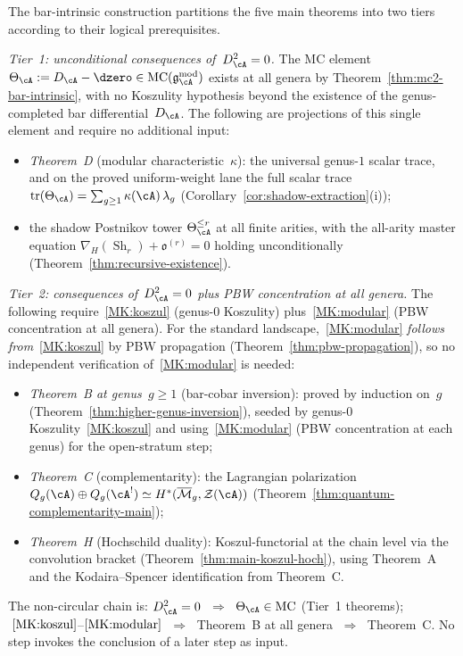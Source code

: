 \begin{remark}
\label{rem:non-circular-logical-chain}
The bar-intrinsic construction partitions the five main
theorems into two tiers according to their logical prerequisites.

\smallskip\noindent
\emph{Tier~1: unconditional consequences of~$D_\cA^2 = 0$.}
The MC element
$\Theta_\cA := D_\cA - \dzero \in
\mathrm{MC}(\mathfrak{g}^{\mathrm{mod}}_\cA)$
exists at all genera by Theorem~\ref{thm:mc2-bar-intrinsic},
with no Koszulity hypothesis beyond the existence of the
genus-completed bar differential~$D_\cA$.  The following are
projections of this single element and require no additional
input:
\begin{itemize}
\item \emph{Theorem~D} (modular characteristic~$\kappa$):
  the universal genus-$1$ scalar trace, and on the proved
  uniform-weight lane the full scalar trace
  $\operatorname{tr}(\Theta_\cA) =
  \sum_{g \geq 1} \kappa(\cA)\,\lambda_g$
  (Corollary~\ref{cor:shadow-extraction}(i));
\item the shadow Postnikov tower $\Theta_\cA^{\leq r}$
  at all finite arities, with the all-arity master equation
  $\nabla_H(\operatorname{Sh}_r) + \mathfrak{o}^{(r)} = 0$
  holding unconditionally
  (Theorem~\ref{thm:recursive-existence}).
\end{itemize}

\smallskip\noindent
\emph{Tier~2: consequences of~$D_\cA^2 = 0$ plus PBW
concentration at all genera.}
The following require~\ref{MK:koszul} (genus-$0$
Koszulity) plus~\ref{MK:modular} (PBW concentration at all
genera).  For the standard landscape,~\ref{MK:modular}
\emph{follows from}~\ref{MK:koszul} by PBW propagation
(Theorem~\ref{thm:pbw-propagation}), so no independent
verification of~\ref{MK:modular} is needed:
\begin{itemize}
\item \emph{Theorem~B at genus~$g \geq 1$}
  (bar-cobar inversion): proved by induction on~$g$
  (Theorem~\ref{thm:higher-genus-inversion}),
  seeded by genus-$0$ Koszulity~\ref{MK:koszul}
  and using~\ref{MK:modular} (PBW concentration at each genus)
  for the open-stratum step;
\item \emph{Theorem~C} (complementarity):
  the Lagrangian polarization
  $Q_g(\cA) \oplus Q_g(\cA^!) \simeq
  H^*(\overline{\mathcal{M}}_g, \mathcal{Z}(\cA))$
  (Theorem~\ref{thm:quantum-complementarity-main});
\item \emph{Theorem~H} (Hochschild duality): Koszul-functorial
  at the chain level via the convolution bracket
  (Theorem~\ref{thm:main-koszul-hoch}), using Theorem~A
  and the Kodaira--Spencer identification from Theorem~C.
\end{itemize}
The non-circular chain is:
$D_\cA^2 = 0$
$\;\Longrightarrow\;$ $\Theta_\cA \in \mathrm{MC}$
(Tier~1 theorems);
$\;\text{\ref{MK:koszul}}$--$\text{\ref{MK:modular}}$
$\;\Longrightarrow\;$ Theorem~B at all genera
$\;\Longrightarrow\;$ Theorem~C.
No step invokes the conclusion of a later step as input.
\end{remark}

